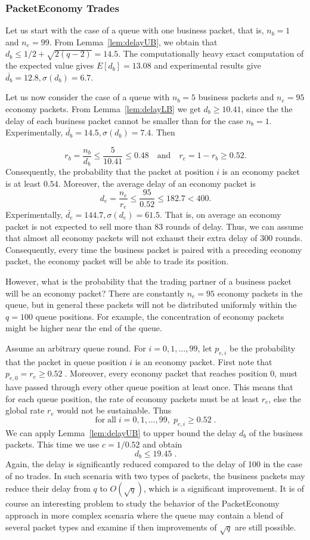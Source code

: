 \documentclass[letterpaper,10pt]{llncs}
\begin{document}
\subsubsection{PacketEconomy Trades}
\label{sec:PETrades}
Let us start with the case of a queue with one business packet, that is, $n_b = 1$ and $n_e = 99$.
From Lemma~\ref{lem:delayUB}, we obtain that $d_b \leq 1/2 + \sqrt{2(q-2)} = 14.5$.
The computationally heavy exact computation of the expected value gives $E[d_b] = 13.08$ and experimental results give $\bar{d_b}=12.8, \sigma(d_b)=6.7$.

Let us now consider the case of a queue with $n_b = 5$ business packets and $n_e = 95$ economy packets.
From Lemma~\ref{lem:delayLB} we get $d_b \geq 10.41$, since the 
the delay of each business packet cannot be smaller than for the case $n_b = 1$. Experimentally, $\bar{d_b}=14.5, \sigma(d_b)=7.4$. Then

\[
r_b = \frac{n_b}{d_b} \leq \frac{5}{10.41} \leq 0.48 \quad \mathrm{and} \quad
 r_e = 1 - r_b \geq 0.52.
\]
Consequently, the probability that the packet at position $i$ is an economy packet is at least $0.54$.
Moreover, the average delay of an economy packet is 
\[
d_e = \frac{n_e}{r_e} \leq \frac{95}{0.52} \leq 182.7 < 400. 
\]
Experimentally, $\bar{d_e}=144.7, \sigma(d_e)=61.5$. That is, on average an economy packet is not expected to sell more than $83$ rounds of delay.
Thus, we can assume that almost all economy packets will not exhaust their extra delay of $300$ rounds.
Consequently, every time the business packet is paired with a preceding economy packet,
the economy packet will be able to trade its position.

However, what is the probability that the trading partner of a business packet 
will be an economy packet? There are constantly $n_e = 95$ economy packets in
the queue, but in general these packets will not be distributed uniformly within
the $q=100$ queue positions. For example, the concentration of economy packets might
be higher near the end of the queue.

Assume an arbitrary queue round. 
For $i=0,1, \dots, 99$, let $p_{e,i}$ be the probability that the packet in queue position $i$
is an economy packet. First note that $p_{e,0} = r_e \geq 0.52 \;. $
Moreover, every economy packet that reaches position $0$, must have passed through every other 
queue position at least once. This means that for each queue position, 
the rate of economy packets must be at least $r_e$,
else the global rate $r_e$ would not be sustainable. Thus
\[ \mathrm{for} \; \mathrm{all} \; i=0,1, \dots, 99, \; p_{e,i} \geq 0.52 \; . \]
We can apply Lemma~\ref{lem:delayUB} to upper bound the delay $d_b$ 
of the business packets. This time we use $c = 1/0.52$ and obtain
\[d_b \leq 19.45 \;. \]
Again, the delay is significantly reduced compared to the delay of 100 in the case of no trades.
In such scenaria with two types of packets, the business packets may reduce 
their delay from $q$ to $O(\sqrt{q})$, which is a significant improvement.
It is of course an interesting problem to study the behavior 
of the PacketEconomy approach in more complex scenaria
where the queue may contain a blend of several packet types
and examine if then improvements of $\sqrt{q}$ are still possible.
\end{document}

